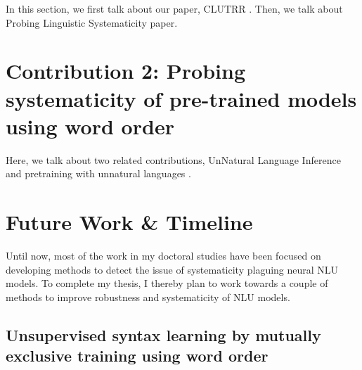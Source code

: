 \documentclass[12pt]{article}
\begin{document}

In this section, we first talk about our paper, CLUTRR \cite{sinha2019a}. Then, we talk about Probing Linguistic Systematicity \cite{goodwin2020} paper.


\section{Contribution 2: Probing systematicity of pre-trained models using word order}
\label{sec:cont2}


Here, we talk about two related contributions, UnNatural Language Inference \cite{sinha2021} and pretraining with unnatural languages \cite{sinha2021a}.



\section{Future Work \& Timeline}

Until now, most of the work in my doctoral studies have been focused on developing methods to detect the issue of systematicity plaguing neural NLU models. To complete my thesis, I thereby plan to work towards a couple of methods to improve robustness and systematicity of NLU models.

\subsection{Unsupervised syntax learning by mutually exclusive training using word order}
\end{document}
